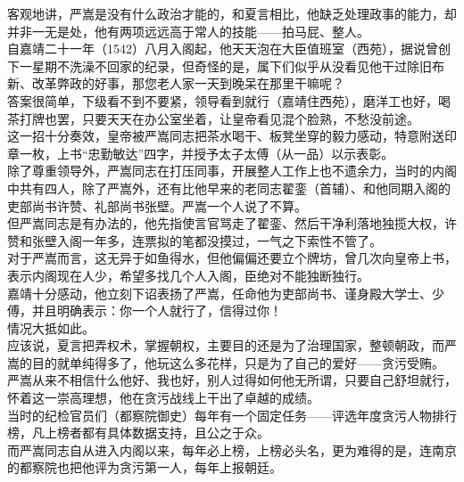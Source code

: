 \begin{multicols}{\theparacolNo}
客观地讲，严嵩是没有什么政治才能的，和夏言相比，他缺乏处理政事的能力，却并非一无是处，他有两项远远高于常人的技能——拍马屁、整人。\\

自嘉靖二十一年（1542）八月入阁起，他天天泡在大臣值班室（西苑），据说曾创下一星期不洗澡不回家的纪录，但奇怪的是，属下们似乎从没看见他干过除旧布新、改革弊政的好事，那您老人家一天到晚呆在那里干嘛呢？\\

答案很简单，下级看不到不要紧，领导看到就行（嘉靖住西苑），磨洋工也好，喝茶打牌也罢，只要天天在办公室坐着，让皇帝看见混个脸熟，不愁没前途。\\

这一招十分奏效，皇帝被严嵩同志把茶水喝干、板凳坐穿的毅力感动，特意附送印章一枚，上书“忠勤敏达”四字，并授予太子太傅（从一品）以示表彰。\\

除了尊重领导外，严嵩同志在打压同事，开展整人工作上也不遗余力，当时的内阁中共有四人，除了严嵩外，还有比他早来的老同志翟銮（首辅）、和他同期入阁的吏部尚书许赞、礼部尚书张壁。严嵩一个人说了不算。\\

但严嵩同志是有办法的，他先指使言官骂走了翟銮、然后干净利落地独揽大权，许赞和张壁入阁一年多，连票拟的笔都没摸过，一气之下索性不管了。\\

对于严嵩而言，这无异于如鱼得水，但他偏偏还要立个牌坊，曾几次向皇帝上书，表示内阁现在人少，希望多找几个人入阁，臣绝对不能独断独行。\\

嘉靖十分感动，他立刻下诏表扬了严嵩，任命他为吏部尚书、谨身殿大学士、少傅，并且明确表示：你一个人就行了，信得过你！\\

情况大抵如此。\\

应该说，夏言把弄权术，掌握朝权，主要目的还是为了治理国家，整顿朝政，而严嵩的目的就单纯得多了，他玩这么多花样，只是为了自己的爱好——贪污受贿。\\

严嵩从来不相信什么他好、我也好，别人过得如何他无所谓，只要自己舒坦就行，怀着这一崇高理想，他在贪污战线上干出了卓越的成绩。\\

当时的纪检官员们（都察院御史）每年有一个固定任务——评选年度贪污人物排行榜，凡上榜者都有具体数据支持，且公之于众。\\

而严嵩同志自从进入内阁以来，每年必上榜，上榜必头名，更为难得的是，连南京的都察院也把他评为贪污第一人，每年上报朝廷。\\


\end{multicols}
